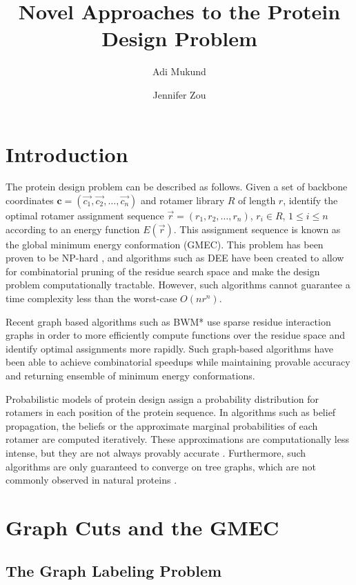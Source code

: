 \documentclass[11pt]{article}
\title{\textbf{Novel Approaches to the Protein Design Problem}}
\author{Adi Mukund \and Jennifer Zou}
\date{}
\begin{document}
	
	\maketitle
	
	\section{Introduction}
	The protein design problem can be described as follows. Given a set of 
	backbone coordinates $\mathbf{c} = (\vec{c_1}, \vec{c_2 }, \dots, \vec{c_n})$
	and rotamer library $R$ of length $r$, identify the optimal rotamer
	assignment sequence $\vec{r} = (r_1, r_2,\dots, r_n)$, $r_i \in R$, 
	$1 \leq i \leq n$ according to an energy function $E(\vec{r})$. This assignment
	sequence is known as the global minimum energy conformation (GMEC). 
	This problem has been proven to be NP-hard \cite{PW02}, and algorithms such 
	as DEE \cite{BD97} have been created to allow for combinatorial pruning of 
	the residue search space and make the design problem computationally tractable.
	However, such algorithms cannot guarantee a time complexity less than the 
	worst-case $O(nr^n)$. 
	
	Recent graph based algorithms such as BWM* \cite{DJJG15} use sparse residue 
	interaction graphs in order to more efficiently compute functions over the residue
	space and identify optimal assignments more rapidly. Such graph-based algorithms
	have been able to achieve combinatorial speedups while maintaining provable
	accuracy and returning ensemble of minimum energy conformations. 	
	
	Probabilistic models of protein design assign a probability distribution 
	for rotamers in each position of the protein sequence.  In algorithms such as
	belief propagation, the beliefs or the approximate marginal probabilities
	of each rotamer are computed iteratively.  These approximations are computationally
	less intense, but they are not always provably accurate \cite{KLX08}. Furthermore,
	such algorithms are only guaranteed to converge on tree graphs, which are not
	commonly observed in natural proteins \cite{FLY09}. 

	\section{Graph Cuts and the GMEC}
	
	\subsection{The Graph Labeling Problem}
	
\end{document}
